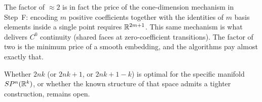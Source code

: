 The factor of $\approx 2$ is in fact the price of the cone-dimension mechanism
in Step~F: encoding $m$ positive coefficients together with the identities of
$m$ basis elements inside a single point requires $\mathbb{R}^{2m+1}$.  This same
mechanism is what delivers $C^0$ continuity (shared faces at zero-coefficient
transitions).  The factor of two is the minimum price of a smooth
embedding, and the algorithms pay almost exactly that.

Whether $2nk$ (or $2nk+1$, or $2nk+1-k$) is optimal for the specific
manifold $SP^{n}(\mathbb{R}^{k})$, or whether the known structure of that space admits a
tighter construction, remains open.
